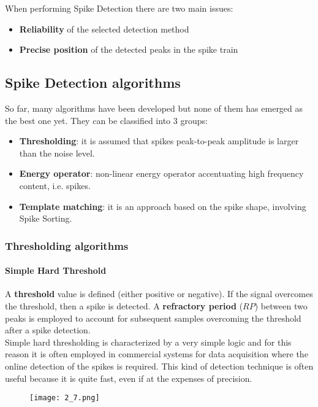 When performing Spike Detection there are two main issues:
\begin{itemize}
    \item \textbf{Reliability} of the selected detection method
    \item \textbf{Precise position} of the detected peaks in the spike train
\end{itemize}

\subsection{Spike Detection algorithms}
So far, many algorithms have been developed but none of them has emerged as the best one yet.
They can be classified into 3 groups:
\begin{itemize}
    \item \textbf{Thresholding}: it is assumed that spikes peak-to-peak amplitude is larger than the noise level.
    \item \textbf{Energy operator}: non-linear energy operator accentuating high frequency content, i.e. spikes.
    \item \textbf{Template matching}: it is an approach based on the spike shape, involving Spike Sorting.
\end{itemize}

\subsubsection{Thresholding algorithms}
\paragraph{Simple Hard Threshold}
A \textbf{threshold} value is defined (either positive or negative). If the signal overcomes the threshold,
then a spike is detected. A \textbf{refractory period} (\(RP\)) between two peaks is employed to account for
subsequent samples overcoming the threshold after a spike detection.\\
Simple hard thresholding is characterized by a very simple logic and for this reason it is often employed in
commercial systems for data acquisition where the online detection of the spikes is required. This kind of
detection technique is often useful because it is quite fast, even if at the expenses of precision.
\begin{figure}[H]
    \centering
    \texttt{[image: 2\_7.png]}
\end{figure}

